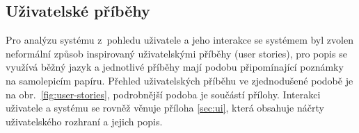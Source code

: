 \documentclass[twoside]{ctuthesis}
\begin{document}
\begin{enumerate}[label=\textbf{O\arabic*.}]
\newpage
\section{Uživatelské příběhy}\label{uc-analysis}

Pro analýzu systému z~pohledu uživatele a jeho interakce se systémem byl zvolen neformální způsob inspirovaný uživatelskými příběhy (user stories), pro popis se využívá běžný jazyk a jednotlivé příběhy mají podobu připomínající poznámky na samolepicím papíru. Přehled uživatelských příběhu ve zjednodušené podobě je na obr.~\ref{fig:user-stories}, podrobnější podoba je součástí přílohy. Interakci uživatele a systému se rovněž věnuje příloha \ref{sec:ui}, která obsahuje náčrty uživatelského rozhraní a jejich popis. 
%





\end{enumerate}
\end{document}
